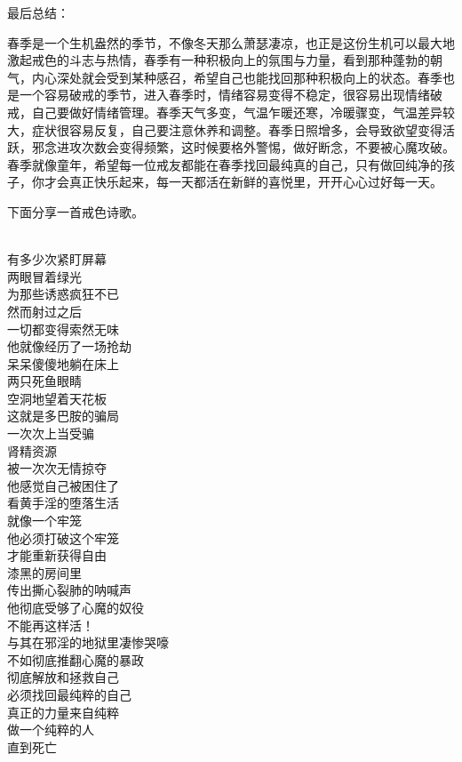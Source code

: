 最后总结：

春季是一个生机盎然的季节，不像冬天那么萧瑟凄凉，也正是这份生机可以最大地激起戒色的斗志与热情，春季有一种积极向上的氛围与力量，看到那种蓬勃的朝气，内心深处就会受到某种感召，希望自己也能找回那种积极向上的状态。春季也是一个容易破戒的季节，进入春季时，情绪容易变得不稳定，很容易出现情绪破戒，自己要做好情绪管理。春季天气多变，气温乍暖还寒，冷暖骤变，气温差异较大，症状很容易反复，自己要注意休养和调整。春季日照增多，会导致欲望变得活跃，邪念进攻次数会变得频繁，这时候要格外警惕，做好断念，不要被心魔攻破。春季就像童年，希望每一位戒友都能在春季找回最纯真的自己，只有做回纯净的孩子，你才会真正快乐起来，每一天都活在新鲜的喜悦里，开开心心过好每一天。

下面分享一首戒色诗歌。

\begin{poem}[找回最纯粹的自己]
    \begin{multicols}{3}
        \begin{center}~\\
            有多少次紧盯屏幕 \\ 两眼冒着绿光 \\ 为那些诱惑疯狂不已 \\ 然而射过之后 \\ 一切都变得索然无味 \\ 他就像经历了一场抢劫 \\ 呆呆傻傻地躺在床上 \\ 两只死鱼眼睛 \\ 空洞地望着天花板 \\ 这就是多巴胺的骗局 \\ 一次次上当受骗 \\ 肾精资源 \\ 被一次次无情掠夺 \\ 他感觉自己被困住了 \\ 看黄手淫的堕落生活 \\ 就像一个牢笼 \\ 他必须打破这个牢笼 \\ 才能重新获得自由 \\ 漆黑的房间里 \\ 传出撕心裂肺的呐喊声 \\ 他彻底受够了心魔的奴役 \\ 不能再这样活！ \\ 与其在邪淫的地狱里凄惨哭嚎 \\ 不如彻底推翻心魔的暴政 \\ 彻底解放和拯救自己 \\ 必须找回最纯粹的自己 \\ 真正的力量来自纯粹 \\ 做一个纯粹的人 \\ 直到死亡
        \end{center}
    \end{multicols}
\end{poem}

